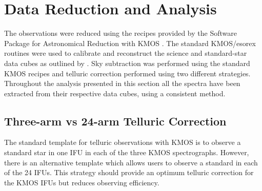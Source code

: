 \documentclass[manuscript]{aastex}
\begin{document}





\section{Data Reduction and Analysis} %
\label{sec:data_reduction_and_analysis}

The observations were reduced using the recipes provided by the Software Package for Astronomical Reduction with KMOS
\citep[SPARK;][]{2013A&A...558A..56D}.
The standard KMOS/esorex routines were used to calibrate and reconstruct the science and standard-star data cubes as outlined by
\cite{2013A&A...558A..56D}.
Sky subtraction was performed using the standard KMOS recipes and telluric correction performed using two different strategies.
Throughout the analysis presented in this section all the spectra have been extracted from their respective data cubes, using a consistent method.



\subsection{Three-arm vs 24-arm Telluric Correction} %
\label{sub:three_arm_vs_24_arm_telluric_correction}

The standard template for telluric observations with KMOS is to observe a standard star in one IFU in each of the three KMOS spectrographs.
However, there is an alternative template which allows users to observe a standard in each of the 24 IFUs.
This strategy should provide an optimum telluric correction for the KMOS IFUs but reduces observing efficiency.
\end{document}
